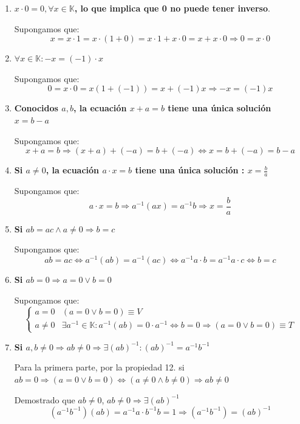 \documentclass[10pt,a4paper,openright]{book}
\theoremstyle{break}
\begin{document}
\begin{enumerate}
\item \textbf{$x\cdot 0=0, \forall x\in \mathbb K$, lo que implica que 0 no puede tener inverso}.\par
 Supongamos que:
 $$x=x\cdot 1=x\cdot (1+0)=x\cdot 1+ x\cdot 0=x+ x\cdot 0 \Rightarrow 0=x\cdot 0$$
 
\item \textbf{$\forall x\in \mathbb K : -x=(-1)\cdot x$}\par
 Supongamos que:
 $$0=x\cdot 0=x(1+(-1))=x+(-1)x \Rightarrow -x=(-1)x$$
 
\item \textbf{Conocidos $a, b$, la ecuación $x+a=b$ tiene una única solución $x=b-a$}\par
 Supongamos que:
 $$x+a=b \Rightarrow (x+a)+(-a)=b+(-a)\Leftrightarrow x=b+(-a)=b-a$$
 
\item \textbf{Si $a\neq 0$, la ecuación $a\cdot x=b$ tiene una única solución : $x=\frac{b}{a}$}\par
Supongamos que:
$$a\cdot x=b \Rightarrow a^{-1}(ax)=a^{-1}b \Rightarrow x=\frac{b}{a}$$

\item \textbf{Si $ab=ac \wedge a\neq 0 \Rightarrow b=c$}\par
 Supongamos que:
 $$ab=ac \Leftrightarrow a^{-1}(ab)=a^{-1}(ac) \Leftrightarrow a^{-1}a\cdot b=a^{-1}a\cdot c \Leftrightarrow b=c$$
 
\item \textbf{Si $ab=0\Rightarrow a=0 \vee b=0$}\par
 Supongamos que:
 \begin{equation*}
 \begin{cases}
  a=0 & (a=0\vee b=0) \equiv V \\
  a\neq 0 & \exists a^{-1}\in \mathbb K : a^{-1}(ab)=0\cdot a^{-1}\Leftrightarrow b=0\Rightarrow (a=0 \vee b=0)\equiv T
 \end{cases} 
 \end{equation*}
 
\item \textbf{Si $a, b \neq 0 \Rightarrow ab\neq 0 \Rightarrow \exists (ab)^{-1}:  (ab)^{-1}= a^{-1}b^{-1}$}\par
 Para la primera parte, por la propiedad 12. si $ab=0\Rightarrow (a=0\vee b=0)\Leftrightarrow (a\neq 0 \wedge b\neq 0) \Rightarrow ab\neq 0$\par
 Demostrado que $ab\neq 0$, $ab\neq 0\Rightarrow \exists (ab)^{-1}$
 $$(a^{-1}b^{-1})(ab)=a^{-1} a \cdot b^{-1} b=1 \Rightarrow (a^{-1}b^{-1})=(ab)^{-1}$$
\end{enumerate}
\end{document}

